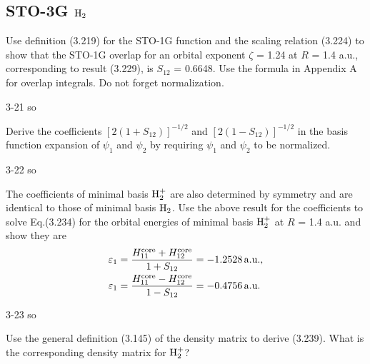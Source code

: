 \documentclass[a4paper]{book}
\newcommand{\core}{{\rm core}}
\begin{document}
	\subsection{STO-3G \texorpdfstring{$\ce{H2}$}-}
	
	\begin{exercise}
	Use definition (3.219) for the STO-1G function and the scaling relation (3.224) to show that the STO-1G overlap for an orbital exponent $\zeta$ = 1.24 at $R$ = 1.4 a.u., corresponding to result (3.229), is $S_{12}$ = 0.6648. Use the formula in Appendix A for overlap integrals. Do not forget normalization.
	\end{exercise}
	
	\begin{solution}
		3-21 so
	\end{solution}
	
	\begin{exercise}
	Derive the coefficients $[2(1+S_{12})]^{-1/2}$ and $[2(1-S_{12})]^{-1/2}$ in the basis function expansion of $\psi_1$ and $\psi_2$ by requiring $\psi_1$ and $\psi_2$ to be normalized.
	\end{exercise}
	
	\begin{solution}
		3-22 so
	\end{solution}

	\begin{exercise}
	The coefficients of minimal basis ${\rm H}^+_2$ are also determined by symmetry and are identical to those of minimal basis $\ce{H2}$. Use the above result for the coefficients to solve Eq.(3.234) for the orbital energies of minimal basis ${\rm H}^+_2$ at $R$ = 1.4 a.u. and show they are
	\begin{align*}
		\varepsilon_1 &= \frac{ H^\core_{11} + H^\core_{12} }{ 1 + S_{12} } = -1.2528  \, \text{a.u.} , \\
		\varepsilon_1 &= \frac{ H^\core_{11} - H^\core_{12} }{ 1 - S_{12} } = -0.4756 \, \text{a.u.}
	\end{align*}
	\end{exercise}
	
	\begin{solution}
		3-23 so
	\end{solution}

	\begin{exercise}
	Use the general definition (3.145) of the density matrix to derive (3.239). What is the corresponding density matrix for ${\rm H}^+_2$?
	\end{exercise}
	
\end{document}

